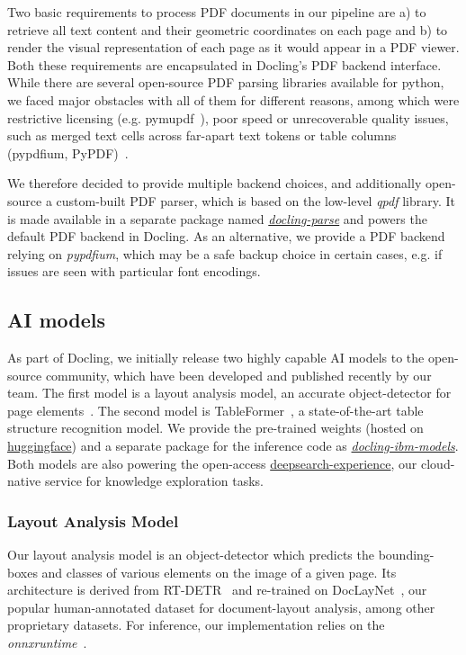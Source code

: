 \documentclass{article}
\begin{document}
Two basic requirements to process PDF documents in our pipeline are a) to retrieve all text content and their geometric coordinates on each page and b) to render the visual representation of each page as it would appear in a PDF viewer. Both these requirements are encapsulated in Docling's PDF backend interface. While there are several open-source PDF parsing libraries available for python, we faced major obstacles with all of them for different reasons, among which were restrictive licensing (e.g. pymupdf~\cite{pymupdf}), poor speed or unrecoverable quality issues, such as merged text cells across far-apart text tokens or table columns (pypdfium, PyPDF)~\cite{pypdfium2,pypdf}.

We therefore decided to provide multiple backend choices, and additionally open-source a custom-built PDF parser, which is based on the low-level \textit{qpdf}\cite{qpdf} library. It is made available in a separate package named \textit{\href{https://pypi.org/project/docling-parse/}{docling-parse}} and powers the default PDF backend in Docling. As an alternative, we provide a PDF backend relying on \textit{pypdfium}, which may be a safe backup choice in certain cases, e.g. if issues are seen with particular font encodings.

\subsection{AI models}

As part of Docling, we initially release two highly capable AI models to the open-source community, which have been developed and published recently by our team. The first model is a layout analysis model, an accurate object-detector for page elements~\cite{dln}. The second model is TableFormer~\cite{tableformer,lysak_optimized_2023}, a state-of-the-art table structure recognition model. We provide the pre-trained weights (hosted on \href{https://huggingface.co/ds4sd/docling-models/}{huggingface}) and a separate package for the inference code as \textit{\href{https://github.com/DS4SD/docling-ibm-models}{docling-ibm-models}}. Both models are also powering the open-access \href{https://ds4sd.github.io}{deepsearch-experience}, our cloud-native service for knowledge exploration tasks. 

\subsubsection*{Layout Analysis Model}
Our layout analysis model is an object-detector which predicts the bounding-boxes and classes of various elements on the image of a given page. Its architecture is derived from RT-DETR~\cite{lv2023detrs} and re-trained on DocLayNet~\cite{dln}, our popular human-annotated dataset for document-layout analysis, among other proprietary datasets. For inference, our implementation relies on the \textit{onnxruntime}~\cite{onnxruntime}.
\end{document}
